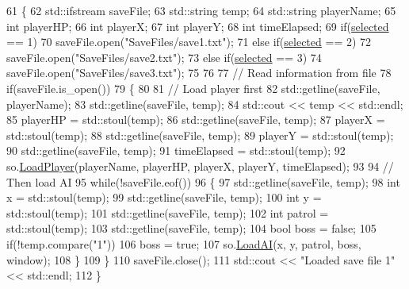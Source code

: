 \begin{DoxyCode}
61 \{
62     std::ifstream saveFile;
63     std::string temp;
64     std::string playerName;
65     \textcolor{keywordtype}{int} playerHP;
66     \textcolor{keywordtype}{int} playerX;
67     \textcolor{keywordtype}{int} playerY;
68     \textcolor{keywordtype}{int} timeElapsed;
69     \textcolor{keywordflow}{if}(\hyperlink{classStateLoadGame_adcf08bbcda5c396a52d513e9576f2b23}{selected} == 1)
70         saveFile.open(\textcolor{stringliteral}{"SaveFiles/save1.txt"});
71     \textcolor{keywordflow}{else} \textcolor{keywordflow}{if}(\hyperlink{classStateLoadGame_adcf08bbcda5c396a52d513e9576f2b23}{selected} == 2)
72         saveFile.open(\textcolor{stringliteral}{"SaveFiles/save2.txt"});
73     \textcolor{keywordflow}{else} \textcolor{keywordflow}{if}(\hyperlink{classStateLoadGame_adcf08bbcda5c396a52d513e9576f2b23}{selected} == 3)
74         saveFile.open(\textcolor{stringliteral}{"SaveFiles/save3.txt"});
75 
76 
77     \textcolor{comment}{// Read information from file}
78     \textcolor{keywordflow}{if}(saveFile.is\_open())
79     \{
80 
81         \textcolor{comment}{// Load player first}
82         std::getline(saveFile, playerName);
83         std::getline(saveFile, temp);
84         std::cout << temp << std::endl;
85         playerHP = std::stoul(temp);
86         std::getline(saveFile, temp);
87         playerX = std::stoul(temp);
88         std::getline(saveFile, temp);
89         playerY = std::stoul(temp);
90         std::getline(saveFile, temp);
91         timeElapsed = std::stoul(temp);
92         so.\hyperlink{classSavedObject_aa92a4d6a7cddb1062ba1240df8d6922f}{LoadPlayer}(playerName, playerHP, playerX, playerY, timeElapsed);
93 
94         \textcolor{comment}{// Then load AI}
95         \textcolor{keywordflow}{while}(!saveFile.eof())
96         \{
97             std::getline(saveFile, temp);
98             \textcolor{keywordtype}{int} x = std::stoul(temp);
99             std::getline(saveFile, temp);
100             \textcolor{keywordtype}{int} y = std::stoul(temp);
101             std::getline(saveFile, temp);
102             \textcolor{keywordtype}{int} patrol = std::stoul(temp);
103             std::getline(saveFile, temp);
104             \textcolor{keywordtype}{bool} boss = \textcolor{keyword}{false};
105             \textcolor{keywordflow}{if}(!temp.compare(\textcolor{stringliteral}{"1"}))
106                 boss = \textcolor{keyword}{true};
107             so.\hyperlink{classSavedObject_afdb01b608d0fc1826b55f4a2c4b0940f}{LoadAI}(x, y, patrol, boss, window);
108         \}
109     \}
110     saveFile.close();
111     std::cout << \textcolor{stringliteral}{"Loaded save file 1"} << std::endl;
112 \}
\end{DoxyCode}
